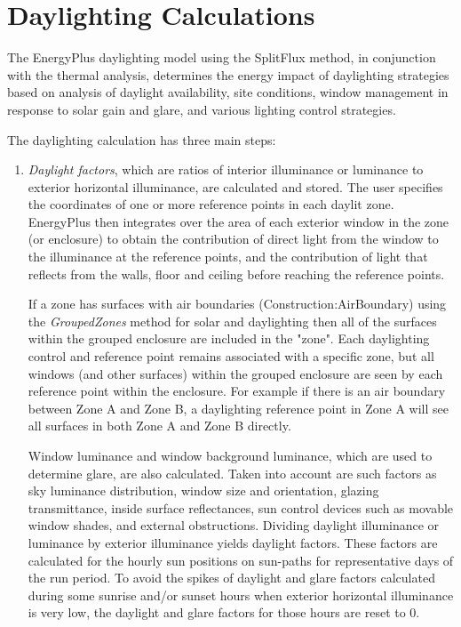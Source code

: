 \section{Daylighting Calculations}\label{daylighting-calculations}

The EnergyPlus daylighting model using the SplitFlux method, in conjunction with the thermal analysis,
determines the energy impact of daylighting strategies based on analysis of daylight availability,
site conditions, window management in response to solar gain and glare, and various lighting control strategies.

The daylighting calculation has three main steps:
\begin{enumerate}
\def\labelenumi{(\arabic{enumi})}
\item
    \emph{Daylight factors}, which are ratios of interior illuminance or luminance to exterior horizontal illuminance, are calculated and stored.
    The user specifies the coordinates of one or more reference points in each daylit zone.
    EnergyPlus then integrates over the area of each exterior window in the zone (or enclosure) to obtain the contribution of direct light from the window to the illuminance at the reference points,
    and the contribution of light that reflects from the walls, floor and ceiling before reaching the reference points. 
    
    If a zone has surfaces with air boundaries (Construction:AirBoundary) 
    using the \textit{GroupedZones} method for solar and daylighting then all of the surfaces within the grouped enclosure are included in the "zone". Each daylighting control and reference point 
    remains associated with a specific zone, but all windows (and other surfaces) within the grouped enclosure are seen by each reference point within the enclosure. For example if there is an air
    boundary between Zone A and Zone B, a daylighting reference point in Zone A will see all surfaces in both Zone A and Zone B directly.
    
    Window luminance and window background luminance, which are used to determine glare, are also calculated.
    Taken into account are such factors as sky luminance distribution, window size and orientation, glazing transmittance, inside surface reflectances,
    sun control devices such as movable window shades, and external obstructions. Dividing daylight illuminance or luminance by exterior illuminance yields daylight factors.
    These factors are calculated for the hourly sun positions on sun-paths for representative days of the run period.
    To avoid the spikes of daylight and glare factors calculated during some sunrise and/or sunset hours when exterior horizontal illuminance is very low,
    the daylight and glare factors for those hours are reset to 0.


\end{enumerate}
